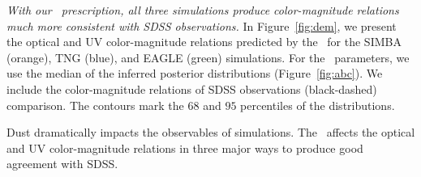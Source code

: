 \emph{With our \eda~prescription, all three simulations produce
color-magnitude relations much more consistent with SDSS observations.}
In Figure~\ref{fig:dem}, we present the optical and UV color-magnitude
relations predicted by the 
\eda~for the SIMBA (orange), TNG (blue), and EAGLE (green) simulations. 
For the \eda~parameters, we use the median of the inferred posterior distributions (Figure~\ref{fig:abc}). 
We include the color-magnitude
relations of SDSS observations (black-dashed) comparison. The contours mark 
the $68$ and $95$ percentiles of the distributions. 

Dust dramatically impacts the observables of simulations. 
The \eda~affects the optical and UV color-magnitude relations in three
major ways to produce good agreement with SDSS. 

